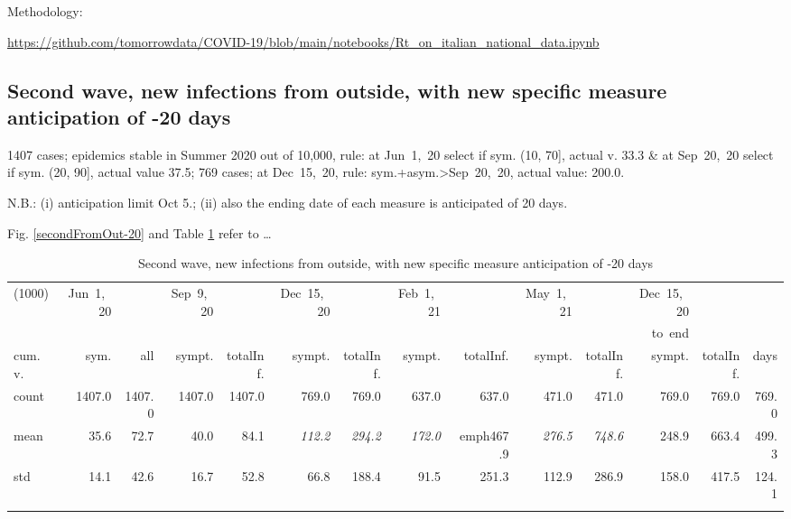 \documentclass[graybox]{svmult}
\begin{document}
Methodology: 

\href{https://github.com/tomorrowdata/COVID-19/blob/main/notebooks/Rt\_on\_italian_national\_data.ipynb}{https://github.com/tomorrowdata/COVID-19/blob/main/notebooks/Rt\_on\_italian\_national\_data.ipynb}


\subsection{Second wave, new infections from outside, with new specific measure anticipation of -20 days}
\label{anticip}

1407 cases; epidemics stable in Summer 2020 out of 10,000, rule: at Jun~1,~20 select if sym. (10, 70], actual v. 33.3 \& at Sep~20,~20 select if sym. (20, 90], actual value 37.5; 769 cases; at Dec~15,~20, rule: sym.+asym.>Sep~20,~20, actual value: 200.0.

N.B.: (i) anticipation limit Oct 5.; (ii) also the ending date of each measure is anticipated of 20 days.

Fig. \ref{secondFromOut-20} and Table \ref{selForceWave2Contr2M-20Tab} refer to \ldots

\begin{table}[t]
\center
\tiny
\begin{tabular}{lrrrrrrrrrrrrr}
\hline\noalign{\smallskip}
(1000) & Jun~1,~20 & & Sep~9,~20 & & Dec~15,~20 & & Feb~1,~21 & & May~1,~21 & & Dec~15,~20 \\
& & & & & & & & & & & to~end \\
cum.~v. & sym. & all & sympt. & totalInf. & sympt. & totalInf. & sympt. & totalInf. & sympt. & totalInf. & sympt. & totalInf. & days\\
\noalign{\smallskip}\svhline\noalign{\smallskip}
count & 1407.0 & 1407.0 & 1407.0 & 1407.0 & 769.0 & 769.0 & 637.0 & 637.0 & 471.0 & 471.0 & 769.0 & 769.0 & 769.0 \\
mean & 35.6 & 72.7 & 40.0 & 84.1 & \emph{{\color{red}112.2}} & \emph{{\color{red} 294.2}} & \emph{172.0} & \ emph{467.9} & \emph{276.5} & \emph{748.6} & 248.9 & 663.4 & 499.3 \\
std & 14.1 & 42.6 & 16.7 & 52.8 & 66.8 & 188.4 & 91.5 & 251.3 & 112.9 & 286.9 & 158.0 & 417.5 & 124.1 \\
\hline\noalign{\smallskip}
\end{tabular}
\caption{Second wave, new infections from outside, with new specific measure anticipation of -20 days}
\label{selForceWave2Contr2M-20Tab}
\end{table}
\end{document}
